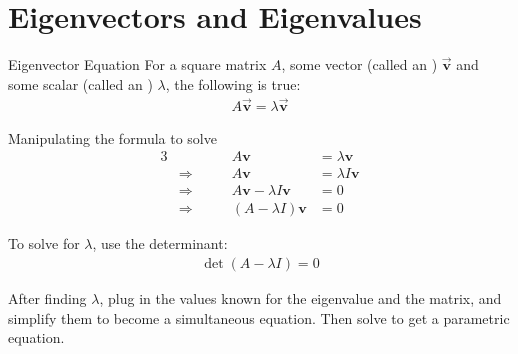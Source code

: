 \documentclass[\main/notes.tex]{subfiles}
\begin{document}
		\section{Eigenvectors and Eigenvalues}
			\begin{sidenote}{Eigenvector Equation}
				For a square matrix $A$, some vector (called an ) $\overrightarrow{\mathbf{v}}$ and some scalar (called an ) $\lambda$, the following is true:
				\begin{align*}
					A\overrightarrow{\mathbf{v}} = \lambda \overrightarrow{\mathbf{v}}
				\end{align*}
			\end{sidenote}
			\begin{theorem}{Manipulating the formula to solve}
				\begin{alignat*}{3}
					& \qquad & A\mathbf{v} &= \lambda \mathbf{v}\\
					& \Rightarrow \qquad & A\mathbf{v} &= \lambda I\mathbf{v}\\
					& \Rightarrow \qquad & A\mathbf{v} - \lambda I\mathbf{v} &= 0\\
					& \Rightarrow \qquad & (A - \lambda I)\mathbf{v} &= 0
				\end{alignat*}

				To solve for $\lambda$, use the determinant:
				\begin{align*}
					\det(A - \lambda I) = 0
				\end{align*}

				After finding $\lambda$, plug in the values known for the eigenvalue and the matrix, and simplify them to become a simultaneous equation. Then solve to get a parametric equation.
			\end{theorem}

\end{document}
